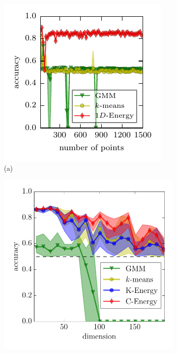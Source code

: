 \documentclass[simplex.tex]{subfiles}
\begin{document}
\begin{figure}[h!]
\begin{cframed}
\centering
\begin{subfigure}[t]{0.32\textwidth}
\centering
\includegraphics[width=\textwidth]{../../figs/lognormal.pdf}\\[-.5em]
(a)
\end{subfigure}
\begin{subfigure}[t]{0.32\textwidth}
\centering
\includegraphics[width=\textwidth]{../../figs/gauss_means.pdf}\\[-.5em]

\end{subfigure}
\end{cframed}
\end{figure}
\end{document}
